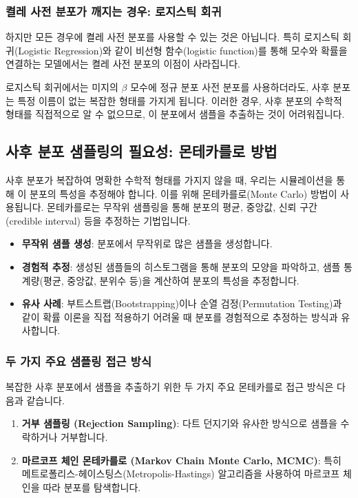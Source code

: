 \documentclass[11pt,a4paper]{book}
\theoremstyle{definition}
\begin{document}
\subsubsection*{켤레 사전 분포가 깨지는 경우: 로지스틱 회귀}
하지만 모든 경우에 켤레 사전 분포를 사용할 수 있는 것은 아닙니다. 특히 로지스틱 회귀(Logistic Regression)와 같이 비선형 함수(logistic function)를 통해 모수와 확률을 연결하는 모델에서는 켤레 사전 분포의 이점이 사라집니다.

\begin{warningbox}[title=로지스틱 회귀의 문제점]
로지스틱 회귀에서는 미지의 $\beta$ 모수에 정규 분포 사전 분포를 사용하더라도, 사후 분포는 특정 이름이 없는 복잡한 형태를 가지게 됩니다.
이러한 경우, 사후 분포의 수학적 형태를 직접적으로 알 수 없으므로, 이 분포에서 샘플을 추출하는 것이 어려워집니다.
\end{warningbox}

\subsection*{사후 분포 샘플링의 필요성: 몬테카를로 방법}
사후 분포가 복잡하여 명확한 수학적 형태를 가지지 않을 때, 우리는 시뮬레이션을 통해 이 분포의 특성을 추정해야 합니다. 이를 위해 몬테카를로(Monte Carlo) 방법이 사용됩니다. 몬테카를로는 무작위 샘플링을 통해 분포의 평균, 중앙값, 신뢰 구간(credible interval) 등을 추정하는 기법입니다.

\begin{infobox}[title=몬테카를로 방법의 핵심]
\begin{itemize}
    \item \textbf{무작위 샘플 생성}: 분포에서 무작위로 많은 샘플을 생성합니다.
    \item \textbf{경험적 추정}: 생성된 샘플들의 히스토그램을 통해 분포의 모양을 파악하고, 샘플 통계량(평균, 중앙값, 분위수 등)을 계산하여 분포의 특성을 추정합니다.
    \item \textbf{유사 사례}: 부트스트랩(Bootstrapping)이나 순열 검정(Permutation Testing)과 같이 확률 이론을 직접 적용하기 어려울 때 분포를 경험적으로 추정하는 방식과 유사합니다.
\end{itemize}
\end{infobox}

\subsubsection*{두 가지 주요 샘플링 접근 방식}
복잡한 사후 분포에서 샘플을 추출하기 위한 두 가지 주요 몬테카를로 접근 방식은 다음과 같습니다.
\begin{enumerate}
    \item \textbf{거부 샘플링 (Rejection Sampling)}: 다트 던지기와 유사한 방식으로 샘플을 수락하거나 거부합니다.
    \item \textbf{마르코프 체인 몬테카를로 (Markov Chain Monte Carlo, MCMC)}: 특히 메트로폴리스-헤이스팅스(Metropolis-Hastings) 알고리즘을 사용하여 마르코프 체인을 따라 분포를 탐색합니다.
\end{enumerate}
\end{document}
